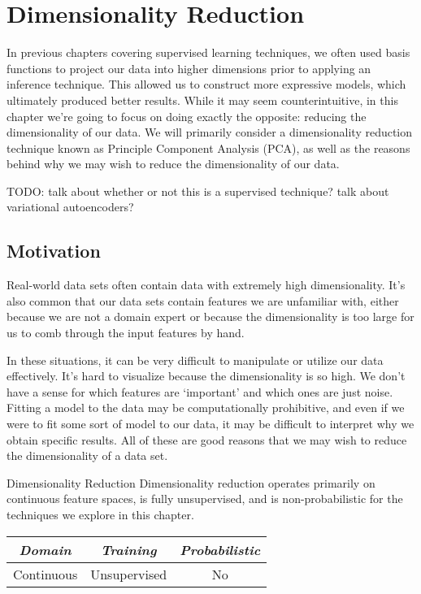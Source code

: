 \chapter{Dimensionality Reduction}
In previous chapters covering supervised learning techniques, we often used basis functions to project our data into higher dimensions prior to applying an inference technique. This allowed us to construct more expressive models, which ultimately produced better results. While it may seem counterintuitive, in this chapter we're going to focus on doing exactly the opposite: reducing the dimensionality of our data. We will primarily consider a dimensionality reduction technique known as Principle Component Analysis (PCA), as well as the reasons behind why we may wish to reduce the dimensionality of our data.

TODO: talk about whether or not this is a supervised technique? talk about variational autoencoders?

\section{Motivation}
Real-world data sets often contain data with extremely high dimensionality. It's also common that our data sets contain features we are unfamiliar with, either because we are not a domain expert or because the dimensionality is too large for us to comb through the input features by hand.

In these situations, it can be very difficult to manipulate or utilize our data effectively. It's hard to visualize because the dimensionality is so high. We don't have a sense for which features are `important' and which ones are just noise. Fitting a model to the data may be computationally prohibitive, and even if we were to fit some sort of model to our data, it may be difficult to interpret why we obtain specific results. All of these are good reasons that we may wish to reduce the dimensionality of a data set.

\begin{mlcube}{Dimensionality Reduction}
Dimensionality reduction operates primarily on continuous feature spaces, is fully unsupervised, and is non-probabilistic for the techniques we explore in this chapter.
\begin{center}
    \begin{tabular}{c|c|c}
    \textit{\textbf{Domain}} & \textit{\textbf{Training}} & \textit{\textbf{Probabilistic}} \\
    \hline
    Continuous & Unsupervised & No \\
    \end{tabular}
\end{center}
\end{mlcube}

